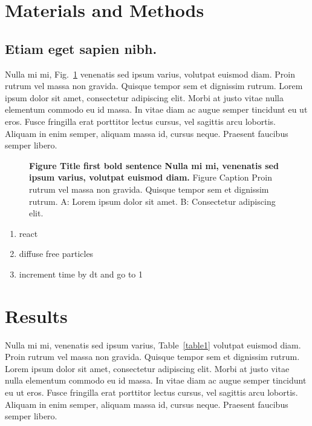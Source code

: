 \documentclass[10pt,letterpaper]{article}
\begin{document}
\section*{Materials and Methods}
\subsection*{Etiam eget sapien nibh.}

Nulla mi mi, Fig.~\ref{fig1} venenatis sed ipsum varius, volutpat euismod diam.
Proin rutrum vel massa non gravida. Quisque tempor sem et dignissim rutrum.
Lorem ipsum dolor sit amet, consectetur adipiscing elit. Morbi at justo vitae
nulla elementum commodo eu id massa. In vitae diam ac augue semper tincidunt eu
ut eros. Fusce fringilla erat porttitor lectus cursus,  vel
sagittis arcu lobortis. Aliquam in enim semper, aliquam massa id, cursus neque.
Praesent faucibus semper libero.

\begin{figure}[h]
\caption{{\bf Figure Title first bold sentence Nulla mi mi, venenatis sed ipsum 
varius, volutpat euismod diam.}
Figure Caption Proin rutrum vel massa non gravida. Quisque tempor sem et dignissim 
rutrum. A: Lorem ipsum dolor sit amet. B: Consectetur adipiscing elit.}
\label{fig1}
\end{figure}

\begin{enumerate}
\item{react}
\item{diffuse free particles}
\item{increment time by dt and go to 1}
\end{enumerate}

\section*{Results}
Nulla mi mi, venenatis sed ipsum varius, Table~\ref{table1} volutpat euismod
diam. Proin rutrum vel massa non gravida. Quisque tempor sem et dignissim
rutrum. Lorem ipsum dolor sit amet, consectetur adipiscing elit. Morbi at justo
vitae nulla elementum commodo eu id massa. In vitae diam ac augue semper
tincidunt eu ut eros. Fusce fringilla erat porttitor lectus cursus, vel sagittis
arcu lobortis. Aliquam in enim semper, aliquam massa id, cursus neque. Praesent
faucibus semper libero.
\end{document}
